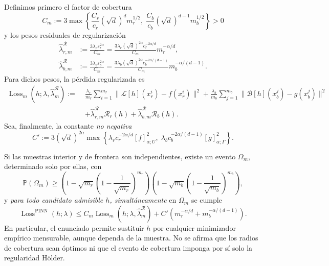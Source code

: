 Definimos primero el factor de cobertura
\begin{equation}\label{eq:thm1_Cm}
C_m:=3\max\left\{
\frac{C_r}{c_r}(\sqrt d)^d m_r^{1/2},\;
\frac{C_b}{c_b}(\sqrt d)^{d-1}m_b^{1/2}\right\}>0
\end{equation}
y los pesos residuales de regularización
\begin{equation}\label{eq:thm1_hatlambda}
\begin{aligned}
\hat\lambda^{\mathcal R}_{r,m}
&:=\frac{3\lambda_r\varepsilon_r^{2\alpha}}{C_m}
=\frac{3\lambda_r(\sqrt d)^{2\alpha}c_r^{-2\alpha/d}}{C_m}
 m_r^{-\alpha/d},\\
\hat\lambda^{\mathcal R}_{b,m}
&:=\frac{3\lambda_b\varepsilon_b^{2\alpha}}{C_m}
=\frac{3\lambda_b(\sqrt d)^{2\alpha}c_b^{-2\alpha/(d-1)}}{C_m}
 m_b^{-\alpha/(d-1)}.
\end{aligned}
\end{equation}
Para dichos pesos, la pérdida regularizada es
\begin{equation}\label{eq:loss_holder}
\begin{aligned}
\operatorname{Loss}_m(h;\lambda,\hat\lambda_m^{\mathcal R})
:=\;&\frac{\lambda_r}{m_r}\sum_{i=1}^{m_r}
\|\mathcal L[h](x_r^i)-f(x_r^i)\|^2
+\frac{\lambda_b}{m_b}\sum_{j=1}^{m_b}
\|\mathcal B[h](x_b^j)-g(x_b^j)\|^2\\
&+\hat\lambda_{r,m}^{\mathcal R}\mathcal R_r(h)
+\hat\lambda_{b,m}^{\mathcal R}\mathcal R_b(h).
\end{aligned}
\end{equation}
Sea, finalmente, la constante \emph{no negativa}
\begin{equation}\label{eq:thm1_Cprime}
C':=3(\sqrt d)^{2\alpha}
\max\left\{
\lambda_r c_r^{-2\alpha/d}[f]_{\alpha;U}^{2},\;
\lambda_b c_b^{-2\alpha/(d-1)}[g]_{\alpha;\Gamma}^{2}
\right\}.
\end{equation}

Si las muestras interior y de frontera son independientes, existe un evento
$\Omega_m$, determinado solo por ellas, con
\begin{equation}\label{eq:thm1_prob}
\mathbb P(\Omega_m)\geq
\left(1-\sqrt{m_r}\left(1-\frac1{\sqrt{m_r}}\right)^{m_r}\right)
\left(1-\sqrt{m_b}\left(1-\frac1{\sqrt{m_b}}\right)^{m_b}\right),
\end{equation}
y \emph{para todo candidato admisible $h$, simultáneamente} en
$\Omega_m$ se cumple
\begin{equation}\label{eq:thm1_main}
\boxed{
\operatorname{Loss}^{\mathrm{PINN}}(h;\lambda)
\leq C_m\operatorname{Loss}_m(h;\lambda,\hat\lambda_m^{\mathcal R})
+C'\left(m_r^{-\alpha/d}+m_b^{-\alpha/(d-1)}\right).}
\end{equation}
En particular, el enunciado permite sustituir $h$ por cualquier
minimizador empírico mensurable, aunque dependa de la muestra.
No se afirma que los radios de cobertura sean óptimos ni que el evento de
cobertura imponga por sí solo la regularidad Hölder.

